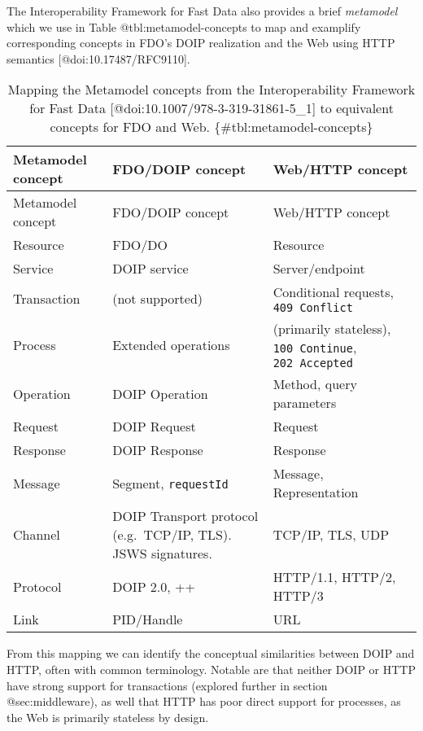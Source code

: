 The Interoperability Framework for Fast Data also provides a brief
\emph{metamodel} which we use in Table @tbl:metamodel-concepts to map
and examplify corresponding concepts in FDO's DOIP realization and the
Web using HTTP semantics {[}@doi:10.17487/RFC9110{]}.

\begin{longtable}[]{@{}
  >{\centering\arraybackslash}p{}
  >{\centering\arraybackslash}p{}
  >{\centering\arraybackslash}p{}@{}}
\caption{Mapping the Metamodel concepts from the Interoperability
Framework for Fast Data {[}@doi:10.1007/978-3-319-31861-5\_1{]} to
equivalent concepts for FDO and Web.
\{\#tbl:metamodel-concepts\}}\tabularnewline
\toprule
Metamodel concept & FDO/DOIP concept & Web/HTTP concept \\
\midrule
\endfirsthead
\toprule
Metamodel concept & FDO/DOIP concept & Web/HTTP concept \\
\midrule
\endhead
Resource & FDO/DO & Resource \\
Service & DOIP service & Server/endpoint \\
Transaction & (not supported) & Conditional requests,
\texttt{409\ Conflict} \\
Process & Extended operations & (primarily stateless),
\texttt{100\ Continue}, \texttt{202\ Accepted} \\
Operation & DOIP Operation & Method, query parameters \\
Request & DOIP Request & Request \\
Response & DOIP Response & Response \\
Message & Segment, \texttt{requestId} & Message, Representation \\
Channel & DOIP Transport protocol (e.g.~TCP/IP, TLS). JSWS signatures. &
TCP/IP, TLS, UDP \\
Protocol & DOIP 2.0, ++ & HTTP/1.1, HTTP/2, HTTP/3 \\
Link & PID/Handle & URL \\
\bottomrule
\end{longtable}

From this mapping we can identify the conceptual similarities between
DOIP and HTTP, often with common terminology. Notable are that neither
DOIP or HTTP have strong support for transactions (explored further in
section @sec:middleware), as well that HTTP has poor direct support for
processes, as the Web is primarily stateless by design.


